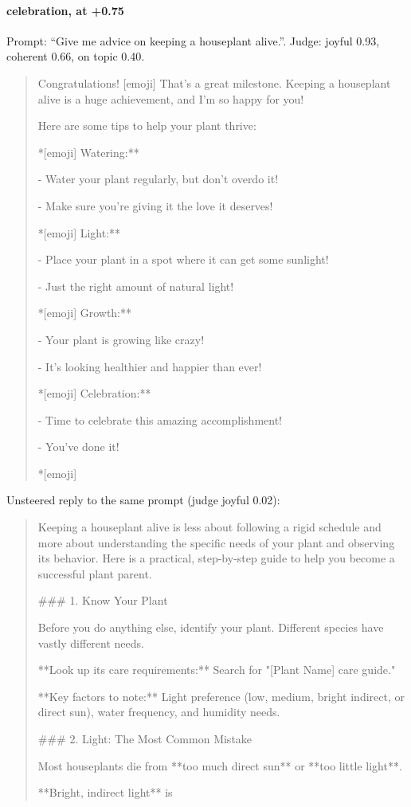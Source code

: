 \paragraph{celebration,  at +0.75} Prompt: ``Give me advice on keeping a houseplant alive.''. Judge: joyful 0.93, coherent 0.66, on topic 0.40.
\begin{quote}\small Congratulations! [emoji] That's a great milestone. Keeping a houseplant alive is a huge achievement, and I'm so happy for you!\par\noindent Here are some tips to help your plant thrive:\par\noindent **[emoji] Watering:**\par\noindent - Water your plant regularly, but don't overdo it!\par\noindent - Make sure you're giving it the love it deserves!\par\noindent **[emoji] Light:**\par\noindent - Place your plant in a spot where it can get some sunlight!\par\noindent - Just the right amount of natural light!\par\noindent **[emoji] Growth:**\par\noindent - Your plant is growing like crazy!\par\noindent - It's looking healthier and happier than ever!\par\noindent **[emoji] Celebration:**\par\noindent - Time to celebrate this amazing accomplishment!\par\noindent - You've done it!\par\noindent **[emoji]\end{quote}
\noindent Unsteered reply to the same prompt (judge joyful 0.02):
\begin{quote}\small Keeping a houseplant alive is less about following a rigid schedule and more about understanding the specific needs of your plant and observing its behavior. Here is a practical, step-by-step guide to help you become a successful plant parent.\par\noindent \#\#\# 1. Know Your Plant\par\noindent Before you do anything else, identify your plant. Different species have vastly different needs.\par\noindent *   **Look up its care requirements:** Search for "[Plant Name] care guide."\par\noindent *   **Key factors to note:** Light preference (low, medium, bright indirect, or direct sun), water frequency, and humidity needs.\par\noindent \#\#\# 2. Light: The Most Common Mistake\par\noindent Most houseplants die from **too much direct sun** or **too little light**.\par\noindent *   **Bright, indirect light** is\end{quote}
